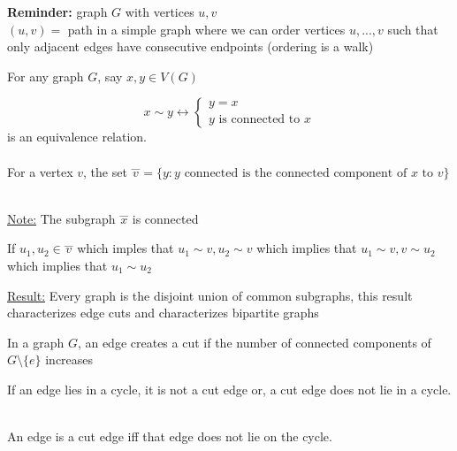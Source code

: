 \documentclass[12pt]{article}
\begin{document}
\begin{tcolorbox}
	\textbf{Reminder:} graph $G$ with vertices $u,v$\\
	$(u,v) = $ path in a simple graph where we can order vertices $u,...,v$ such that only adjacent edges have consecutive endpoints (ordering is a walk)
\end{tcolorbox}

For any graph $G$, say $x,y \in V(G)$

$$x\sim y \leftrightarrow \begin{cases}
	y=x\\
	y \text{ is connected to } x
\end{cases}
$$
is an equivalence relation.\\
\\
For a vertex $v$, the set $\overset{\_\_\_}{v} = \{ y : y \text{ connected is the connected component of } x \text{ to } v \} $\\
\\
\begin{tcolorbox}
	\underline{Note:} The subgraph $\overset{\_\_\_}{x}$ is connected
\end{tcolorbox}

If $u_1, u_2 \in \overset{\_\_\_}{v}$ which imples that $u_1 \sim v, u_2 \sim v$ which implies that $u_1 \sim v, v \sim u_2$ which implies that $u_1 \sim u_2$

\begin{tcolorbox}
	\underline{Result:} Every graph is the disjoint union of common subgraphs, this result characterizes edge cuts and characterizes bipartite graphs
\end{tcolorbox}

\begin{tcolorbox}[title=Definition: Edge Cuts]
	In a graph $G$, an edge creates a cut if the number of connected components of $G \setminus \{ e \}$ increases
\end{tcolorbox}

If an edge lies in a cycle, it is not a cut edge or, a cut edge does not lie in a cycle.\\
\\
\begin{tcolorbox}[title=Thereom]
	An edge is a cut edge iff that edge does not lie on the cycle.
\end{tcolorbox}
\end{document}
